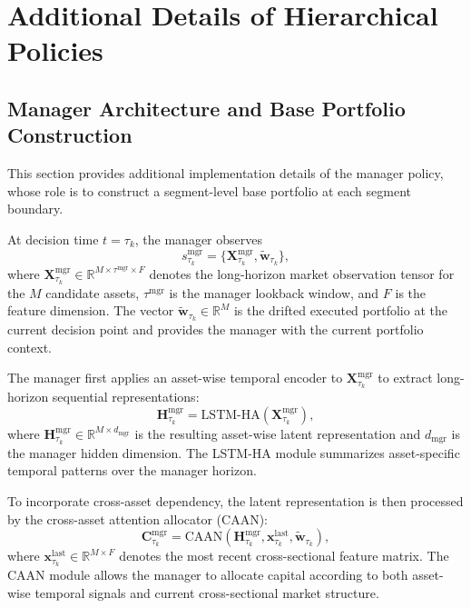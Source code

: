 \documentclass[letterpaper]{article} %
\begin{document}
\appendix

\section{Additional Details of Hierarchical Policies}
\label{app:hier_policy}

\subsection{Manager Architecture and Base Portfolio Construction}
\label{app:hier_manager}

This section provides additional implementation details of the manager policy, whose role is to construct a segment-level base portfolio at each segment boundary.

At decision time \(t=\tau_k\), the manager observes
\[
s^{\mathrm{mgr}}_{\tau_k}
=
\bigl\{\mathbf{X}^{\mathrm{mgr}}_{\tau_k},\tilde{\mathbf{w}}_{\tau_k}\bigr\},
\]
where \(\mathbf{X}^{\mathrm{mgr}}_{\tau_k}\in\mathbb{R}^{M\times \tau^{\mathrm{mgr}}\times F}\) denotes the long-horizon market observation tensor for the \(M\) candidate assets, \(\tau^{\mathrm{mgr}}\) is the manager lookback window, and \(F\) is the feature dimension. The vector \(\tilde{\mathbf{w}}_{\tau_k}\in\mathbb{R}^{M}\) is the drifted executed portfolio at the current decision point and provides the manager with the current portfolio context.

The manager first applies an asset-wise temporal encoder to \(\mathbf{X}^{\mathrm{mgr}}_{\tau_k}\) to extract long-horizon sequential representations:
\[
\mathbf{H}^{\mathrm{mgr}}_{\tau_k}
=
\mathrm{LSTM\mbox{-}HA}\!\left(\mathbf{X}^{\mathrm{mgr}}_{\tau_k}\right),
\]
where \(\mathbf{H}^{\mathrm{mgr}}_{\tau_k}\in\mathbb{R}^{M\times d_{\mathrm{mgr}}}\) is the resulting asset-wise latent representation and \(d_{\mathrm{mgr}}\) is the manager hidden dimension. The LSTM-HA module summarizes asset-specific temporal patterns over the manager horizon.

To incorporate cross-asset dependency, the latent representation is then processed by the cross-asset attention allocator (CAAN):
\[
\mathbf{C}^{\mathrm{mgr}}_{\tau_k}
=
\mathrm{CAAN}\!\left(
\mathbf{H}^{\mathrm{mgr}}_{\tau_k},
\mathbf{x}^{\mathrm{last}}_{\tau_k},
\tilde{\mathbf{w}}_{\tau_k}
\right),
\]
where \(\mathbf{x}^{\mathrm{last}}_{\tau_k}\in\mathbb{R}^{M\times F}\) denotes the most recent cross-sectional feature matrix. The CAAN module allows the manager to allocate capital according to both asset-wise temporal signals and current cross-sectional market structure.
\end{document}
